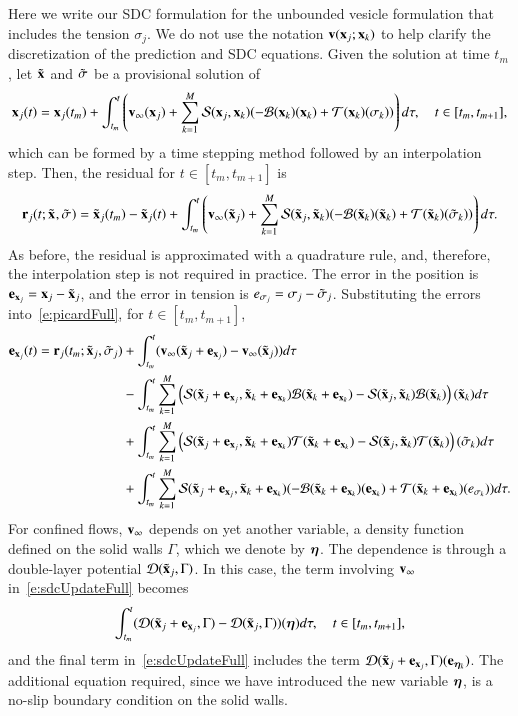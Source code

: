 Here we write our SDC formulation for the unbounded vesicle formulation
that includes the tension $\sigma_{j}$.  We do not use the notation
${\mathbf{v}}({\mathbf{x}}_{j};{\mathbf{x}}_{k})$ to help clarify the discretization of the
prediction and SDC equations.  Given the solution at time
$t_{m}$, let ${\tilde{{\mathbf{x}}}_{}}$ and ${\tilde{\sigma}_{}}$ be a provisional solution of
\begin{align}
  \xx_{j}(t) = \xx_{j}(t_{m}) + \int_{t_{m}}^{t} \left(\vv_{\infty}(\xx_{j}) + 
    \sum_{k=1}^{M}\SS(\xx_{j},\xx_{k})(-\BB(\xx_{k})(\xx_{k}) + 
    \TT(\xx_{k})(\sigma_{k}))\right)d\tau, \quad t \in [t_{m},t_{m+1}],
  \label{e:picardFull}
\end{align}
which can be formed by a time stepping method followed by an
interpolation step.  Then, the residual for $t \in [t_{m},t_{m+1}]$ is
\begin{align*}
  {\mathbf{r}}_{j}(t;{\tilde{{\mathbf{x}}}_{}},{\tilde{\sigma}_{}}) = {\tilde{{\mathbf{x}}}_{j}}(t_{m}) - {\tilde{{\mathbf{x}}}_{j}}(t) + 
    \int_{t_{m}}^{t} \left({\mathbf{v}}_{\infty}({\tilde{{\mathbf{x}}}_{j}}) + 
    \sum_{k=1}^{M}{\mathcal{S}}({\tilde{{\mathbf{x}}}_{j}},{\tilde{{\mathbf{x}}}_{k}})(-{\mathcal{B}}({\tilde{{\mathbf{x}}}_{k}})({\tilde{{\mathbf{x}}}_{k}}) + 
    {\mathcal{T}}({\tilde{{\mathbf{x}}}_{k}})({\tilde{\sigma}_{k}}))\right)d\tau.
\end{align*}
As before, the residual is approximated with a quadrature rule, and,
therefore, the interpolation step is not required in practice.  The
error in the position is ${\mathbf{e}_{{\mathbf{x}}_{j}}} = {\mathbf{x}}_{j} - {\tilde{{\mathbf{x}}}_{j}}$, and the error
in tension is ${e_{\sigma_{j}}} = \sigma_{j} - {\tilde{\sigma}_{j}}$.  Substituting the
errors into~\eqref{e:picardFull}, for $t \in [t_{m},t_{m+1}]$,
\begin{equation}
\begin{aligned}
  \exx{j}(t) = \rr_{j}(t_{m};\txx{j},\tsigma{j}) &+
    \int_{t_{m}}^{t}(\vv_{\infty}(\txx{j}+\exx{j}) -
      \vv_{\infty}(\txx{j}))d\tau \\
    &-\int_{t_{m}}^{t}\sum_{k=1}^{M}
    \left(\SS(\txx{j}+\exx{j},\txx{k}+\exx{k})
      \BB(\txx{k}+\exx{k}) - \SS(\txx{j},\txx{k})\BB(\txx{k})
        \right)(\txx{k}) d\tau \\
    &+\int_{t_{m}}^{t}\sum_{k=1}^{M}
      \left(\SS(\txx{j}+\exx{j},\txx{k}+\exx{k})
      \TT(\txx{k}+\exx{k}) - \SS(\txx{j},\txx{k})\TT(\txx{k})
        \right)(\tsigma{k}) d\tau \\
    &+\int_{t_{m}}^{t}\sum_{k=1}^{M} \SS(\txx{j}+\exx{j},\txx{k}+\exx{k})
      (-\BB(\txx{k}+\exx{k})(\exx{k}) +
        \TT(\txx{k}+\exx{k})(\esigma{k}))d\tau.
\end{aligned}
\label{e:sdcUpdateFull}
\end{equation}
For confined flows, ${\mathbf{v}}_{\infty}$ depends on yet another variable, a
density function defined on the solid walls $\Gamma$, which we denote
by ${\boldsymbol\eta}$.  The dependence is through a double-layer potential
${\mathcal{D}}({\tilde{{\mathbf{x}}}_{j}},\Gamma)$.  In this case, the term involving ${\mathbf{v}}_{\infty}$
in~\eqref{e:sdcUpdateFull} becomes
\begin{align*}
  \int_{t_{m}}^{t}({\mathcal{D}}({\tilde{{\mathbf{x}}}_{j}}+{\mathbf{e}_{{\mathbf{x}}_{j}}},\Gamma) - {\mathcal{D}}({\tilde{{\mathbf{x}}}_{j}},\Gamma))
      ({\boldsymbol\eta}) d\tau, \quad t \in [t_{m},t_{m+1}],
\end{align*}
and the final term in~\eqref{e:sdcUpdateFull} includes the term
${\mathcal{D}}({\tilde{{\mathbf{x}}}_{j}}+{\mathbf{e}_{{\mathbf{x}}_{j}}},\Gamma)({\mathbf{e}}_{{\boldsymbol\eta}_{k}})$.  The additional
equation required, since we have introduced the new variable ${\boldsymbol\eta}$,
is a no-slip boundary condition on the solid walls.


